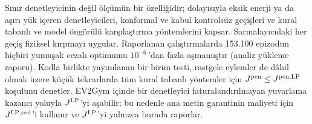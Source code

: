 Sınır denetleyicinin değil ölçümün bir özelliğidir; dolayısıyla eksik enerji ya da aşırı yük içeren denetleyicileri, konformal ve kabul kontrolsüz geçişleri ve kural tabanlı ve model öngörülü karşılaştırma yöntemlerini kapsar.
Sarmalayıcıdaki her geçiş fiziksel kırpmayı uygular.
Raporlanan çalıştırmalarda 153.100 epizodun hiçbiri yumuşak cezalı optimumu $10^{-6}$\,\texteuro{}'dan fazla aşmamıştır (analiz yükleme raporu).
Kodla birlikte yayımlanan bir birim testi, rastgele eylemler de dâhil olmak üzere küçük tekrarlarda tüm kural tabanlı yöntemler için $J^{\mathrm{pen}}\le J^{\mathrm{pen,LP}}$ koşulunu denetler.
EV2Gym içinde bir denetleyici faturalandırılmayan yuvarlama kazancı yoluyla $J^{\mathrm{LP}}$'yi aşabilir; bu nedenle ana metin garantinin maliyeti için $J^{\mathrm{LP,ceil}}$'i kullanır ve $J^{\mathrm{LP}}$'yi yalnızca burada raporlar.
